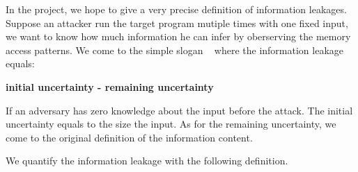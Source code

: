 \begin{figure}
\centering
{}
\end{figure}

In the project, we hope to give a very precise definition of information leakages. 
Suppose an attacker run the target program mutiple times with one fixed input, we
want to know how much information he can infer by oberserving the memory access patterns.
We come to the simple slogan ~\cite{10.1007/978-3-642-00596-1_21} where the information
leakage equals:

\textbf{initial uncertainty - remaining uncertainty}

If an adversary has zero knowledge about the input before the attack. The initial uncertainty
equals to the size the input. As for the remaining uncertainty, we come to the original definition
of the information content.

We quantify the information leakage with the following definition. 

